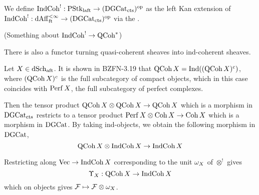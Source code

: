 \documentclass[./main.tex]{subfiles}
\begin{document}
\begin{dfn}
  
  We define $\mathrm{IndCoh}^! : \mathrm{PStk}_{\mathrm{laft}} \to (\mathrm{DGCat}_{\mathrm{cts}})^{\mathrm{op}}$
  as the left Kan extension of 
  $\mathrm{IndCoh}^! : \mathrm{dAff}^{<\infty}_{\mathrm{ft}} \to (\mathrm{DGCat}_{\mathrm{cts}})^{\mathrm{op}}$
  via the .
\end{dfn}
  
(Something about $\mathrm{IndCoh}^! \to \mathrm{QCoh}^*$)

There is also a functor turning quasi-coherent sheaves into
ind-coherent sheaves.

\begin{dfn}
  
  Let $X \in \mathrm{dSch}_{\mathrm{aft}}$.
  It is shown in BZFN-3.19 that $\mathrm{QCoh}\,X = \mathrm{Ind}((\mathrm{QCoh}\,X)^c)$,
  where $(\mathrm{QCoh}\,X)^c$ is the full subcategory of compact objects,
  which in this case coincides with $\mathrm{Perf}\,X$,
  the full subcategory of perfect complexes.

  Then the tensor product $\mathrm{QCoh}\,X \otimes \mathrm{QCoh}\,X \to \mathrm{QCoh}\,X$ 
  which is a morphism in $\mathrm{DGCat}_{\mathrm{cts}}$
  restricts to a tensor product $\mathrm{Perf}\,X \otimes \mathrm{Coh}\,X \to \mathrm{Coh}\,X$
  which is a morphism in $\mathrm{DGCat}$.
  By taking ind-objects,
  we obtain the following morphism in $\mathrm{DGCat}$, 
  \[
    \mathrm{QCoh}\,X \otimes \mathrm{IndCoh}\,X \to \mathrm{IndCoh}\,X
  \]
  
  Restricting along $\mathrm{Vec} \to \mathrm{IndCoh}\,X$ corresponding to
  the unit $\omega_X$ of $\otimes^!$ gives 
  \[
    \Upsilon_X : \mathrm{QCoh}\,X \to \mathrm{IndCoh}\,X
  \]
  which on objects gives $\mathcal{F} \mapsto \mathcal{F} \otimes \omega_X$.


\end{dfn}
\end{document}
